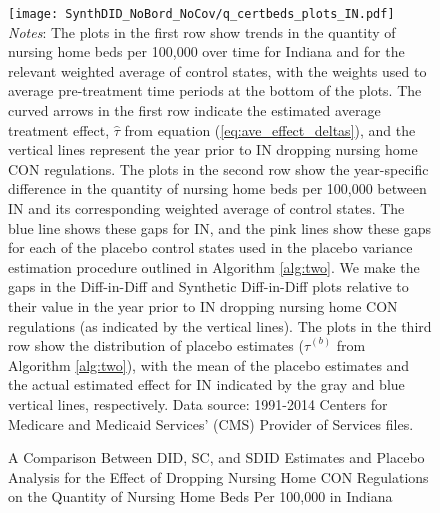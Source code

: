 \documentclass[../Main.tex]{subfiles}
\begin{document}
\newpage
{}
\begin{figure}[t] 
    \setlength{}
	\caption{\label{fig:q_certbeds_plots_in} \centering A Comparison Between DID, SC, and SDID Estimates and Placebo Analysis for the Effect of Dropping Nursing Home CON Regulations on the Quantity of Nursing Home Beds Per 100,000 in Indiana} {\centering\texttt{[image: SynthDID\_NoBord\_NoCov/q\_certbeds\_plots\_IN.pdf]}}
    \vspace{-1.4cm}\\
    \scriptsize
		\textit{Notes}: The plots in the first row show trends in the quantity of nursing home beds per 100,000 over time for Indiana and for the relevant weighted average of control states, with the weights used to average pre-treatment time periods at the bottom of the plots. The curved arrows in the first row indicate the estimated average treatment effect, $\hat{\tau}$ from equation (\ref{eq:ave_effect_deltas}), and the vertical lines represent the year prior to IN dropping nursing home CON regulations. The plots in the second row show the year-specific difference in the quantity of nursing home beds per 100,000 between IN and its corresponding weighted average of control states. The blue line shows these gaps for IN, and the pink lines show these gaps for each of the placebo control states used in the placebo variance estimation procedure outlined in Algorithm \ref{alg:two}. We make the gaps in the Diff-in-Diff and Synthetic Diff-in-Diff plots relative to their value in the year prior to IN dropping nursing home CON regulations (as indicated by the vertical lines). The plots in the third row show the distribution of placebo estimates ($\hat{\tau}^{(b)}$ from Algorithm \ref{alg:two}), with the mean of the placebo estimates and the actual estimated effect for IN indicated by the gray and blue vertical lines, respectively. Data source: 1991-2014 Centers for Medicare and Medicaid Services’ (CMS) Provider of Services files.
\end{figure}
\restoregeometry
\clearpage
\end{document}
